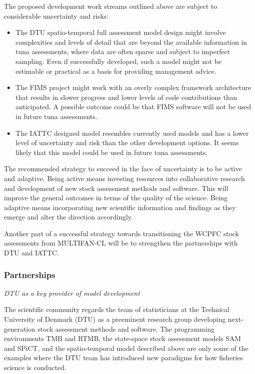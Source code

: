 \documentclass{SCreport}
\begin{document}
The proposed development work streams outlined above are subject to considerable
uncertainty and risks:

\begin{itemize}
  \item The DTU spatio-temporal full assessment model design might involve
  complexities and levels of detail that are beyond the available information in
  tuna assessments, where data are often sparse and subject to imperfect
  sampling. Even if successfully developed, such a model might not be estimable
  or practical as a basis for providing management advice.
  \item The FIMS project might work with an overly complex framework
  architecture that results in slower progress and lower levels of code
  contributions than anticipated. A possible outcome could be that FIMS software
  will not be used in future tuna assessments.
  \item The IATTC designed model resembles currently used models and has a lower
  level of uncertainty and risk than the other development options. It seems
  likely that this model could be used in future tuna assessments.
\end{itemize}

\vspace{1ex}

The recommended strategy to succeed in the face of uncertainty is to be active
and adaptive. Being active means investing resources into collaborative research
and development of new stock assessment methods and software. This will improve
the general outcomes in terms of the quality of the science. Being adaptive
means incorporating new scientific information and findings as they emerge and
alter the direction accordingly.

Another part of a successful strategy towards transitioning the WCPFC stock
assessments from MULTIFAN-CL will be to strengthen the partnerships with DTU and
IATTC.

\vspace{2ex}

\subsubsection{Partnerships}

\textit{DTU as a key provider of model development}

The scientific community regards the team of statisticians at the Technical
University of Denmark (DTU) as a preeminent research group developing
next-generation stock assessment methods and software. The programming
environments TMB and RTMB, the state-space stock assessment models SAM and
SPiCT, and the spatio-temporal model described above are only some of the
examples where the DTU team has introduced new paradigms for how fisheries
science is conducted.
\end{document}
